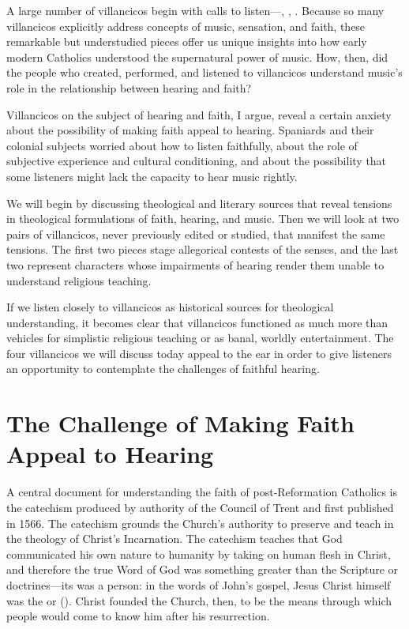 A large number of villancicos begin with calls to listen---, , .
Because so many villancicos explicitly address concepts of music, sensation, and faith, these remarkable but understudied pieces offer us unique insights into how early modern Catholics understood the supernatural power of music.
How, then, did the people who created, performed, and listened to villancicos understand music's role in the relationship between hearing and faith?

Villancicos on the subject of hearing and faith, I argue, reveal a certain anxiety about the possibility of making faith appeal to hearing.
Spaniards and their colonial subjects worried about how to listen faithfully, about the role of subjective experience and cultural conditioning, and about the possibility that some listeners might lack the capacity to hear music rightly.

We will begin by discussing theological and literary sources that reveal tensions in theological formulations of faith, hearing, and music.
Then we will look at two pairs of villancicos, never previously edited or studied, that manifest the same tensions.
The first two pieces stage allegorical contests of the senses, and the last two represent characters whose impairments of hearing render them unable to understand religious teaching.

If we listen closely to villancicos as historical sources for theological understanding, it becomes clear that villancicos functioned as much more than vehicles for simplistic religious teaching or as banal, worldly entertainment.
The four villancicos we will discuss today appeal to the ear in order to give listeners an opportunity to contemplate the challenges of faithful hearing.

\section{The Challenge of Making Faith Appeal to Hearing}

A central document for understanding the faith of post-Reformation Catholics is the catechism produced  by authority of the Council of Trent and first published in 1566.%
\autocites{Catholic:Catechismus1614}[]{NewCatholic}
The catechism grounds the Church's authority to preserve and teach  in the theology of Christ's Incarnation.
The catechism teaches that God communicated his own nature to humanity by taking on human flesh in Christ, and therefore the true Word of God was something greater than the Scripture or doctrines---its was a person: in the words of John's gospel, Jesus Christ himself was the  or  ().
Christ founded the Church, then, to be the means through which people would come to know him after his resurrection.

